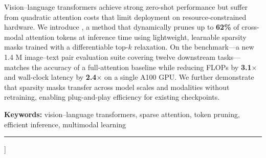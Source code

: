 {\begin{center}
    \begin{minipage}{0.92\linewidth}
      \begin{tcolorbox}[highlightbox, title={Abstract}]
        \small
        Vision--language transformers achieve strong zero-shot performance
        but suffer from quadratic attention costs that limit deployment on
        resource-constrained hardware. We introduce \modelname{}, a method
        that dynamically prunes up to \textbf{62\%} of cross-modal attention
        tokens at inference time using lightweight, learnable sparsity masks
        trained with a differentiable top-\(k\) relaxation. On the \dataset{}
        benchmark---a new 1.4 M image--text pair evaluation suite covering
        twelve downstream tasks---\modelname{} matches the accuracy of a
        full-attention \baseline{} baseline while reducing FLOPs by
        \textbf{3.1\(\times\)} and wall-clock latency by \textbf{2.4\(\times\)}
        on a single A100 GPU. We further demonstrate that sparsity masks
        transfer across model scales and modalities without retraining,
        enabling plug-and-play efficiency for existing checkpoints.
      \end{tcolorbox}
    \end{minipage}

    \vspace{6pt}

    {\small\color{NexaGray}
      \textbf{Keywords:} vision--language transformers,
      sparse attention, token pruning, efficient inference, multimodal learning
    \par}

    \vspace{14pt}
    \noindent\textcolor{NexaAccent}{\rule{0.92\linewidth}{1pt}}
    \vspace{8pt}
  \end{center}
}]
